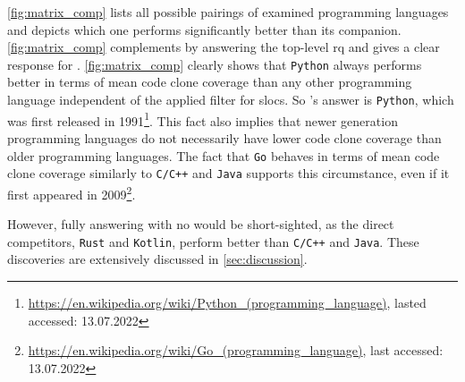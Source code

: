 \autoref{fig:matrix_comp} lists all possible pairings of examined programming languages and depicts which one performs significantly better than its companion. \autoref{fig:matrix_comp} complements  by answering the top-level \ac{rq} and gives a clear response for .
\autoref{fig:matrix_comp} clearly shows that \texttt{Python} always performs better in terms of mean code clone coverage than any other programming language independent of the applied filter for \aclp{sloc}. So  's answer is \texttt{Python}, which was first released in 1991\footnote{\url{https://en.wikipedia.org/wiki/Python_(programming_language)}, lasted accessed: 13.07.2022}.
This fact also implies that newer generation programming languages do not necessarily have lower code clone coverage than older programming languages. The fact that \texttt{Go} behaves in terms of mean code clone coverage similarly to \texttt{C/C++} and \texttt{Java} supports this circumstance, even if it first appeared in 2009\footnote{\url{https://en.wikipedia.org/wiki/Go_(programming_language)}, last accessed: 13.07.2022}.

However, fully answering  with no would be short-sighted, as the direct competitors, \texttt{Rust} and \texttt{Kotlin}, perform better than \texttt{C/C++} and \texttt{Java}. These discoveries are extensively discussed in \autoref{sec:discussion}.

